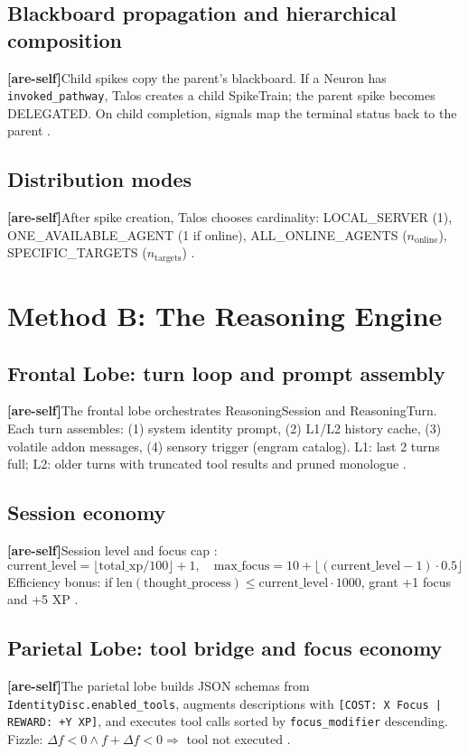 \documentclass[11pt]{article}
\newcommand{\areself}{\textbf{[are-self]}}
\begin{document}
	\subsection{Blackboard propagation and hierarchical composition}
	\areself Child spikes copy the parent's blackboard. If a Neuron has \texttt{invoked\_pathway}, Talos creates a child SpikeTrain; the parent spike becomes DELEGATED. On child completion, signals map the terminal status back to the parent \cite{talosCNS,talosLiveCodebase}.
	
	\subsection{Distribution modes}
	\areself After spike creation, Talos chooses cardinality: LOCAL\_SERVER (1), ONE\_AVAILABLE\_AGENT (1 if online), ALL\_ONLINE\_AGENTS ($n_{\text{online}}$), SPECIFIC\_TARGETS ($n_{\text{targets}}$) \cite{talosCNS,talosCombined}.
	
	\section{Method B: The Reasoning Engine}
	\label{are-self:reasoning}
	\subsection{Frontal Lobe: turn loop and prompt assembly}
	\areself The frontal lobe orchestrates ReasoningSession and ReasoningTurn. Each turn assembles: (1) system identity prompt, (2) L1/L2 history cache, (3) volatile addon messages, (4) sensory trigger (engram catalog). L1: last 2 turns full; L2: older turns with truncated tool results and pruned monologue \cite{talosFrontal,talosLiveCodebase}.
	
	\subsection{Session economy}
	\areself Session level and focus cap \cite{talosFrontal,talosCombined}:
	$$
	\text{current\_level} = \lfloor \text{total\_xp} / 100 \rfloor + 1, \quad \text{max\_focus} = 10 + \lfloor (\text{current\_level} - 1) \cdot 0.5 \rfloor
	$$
	Efficiency bonus: if $\text{len}(\text{thought\_process}) \leq \text{current\_level} \cdot 1000$, grant +1 focus and +5 XP \cite{talosFrontal}.
	
	\subsection{Parietal Lobe: tool bridge and focus economy}
	\areself The parietal lobe builds JSON schemas from \texttt{IdentityDisc.enabled\_tools}, augments descriptions with \texttt{[COST: X Focus | REWARD: +Y XP]}, and executes tool calls sorted by \texttt{focus\_modifier} descending. Fizzle: $\Delta f < 0 \land f + \Delta f < 0 \Rightarrow$ tool not executed \cite{talosParietal,talosCombined}.
	
\end{document}
